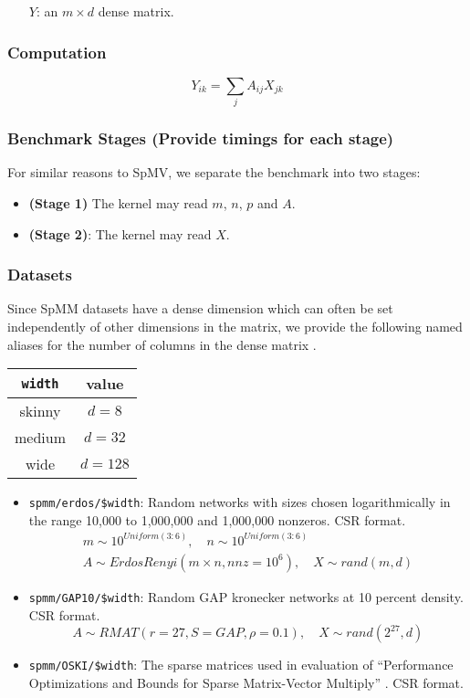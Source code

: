 \documentclass{article}
\begin{document}
\begin{itemize}
	\item[$Y$:] an $m \times d$ dense matrix.
\end{itemize}

\subsubsection{Computation}

$$Y_{ik} = \sum_{j}A_{ij}X_{jk}$$

\subsubsection{Benchmark Stages (Provide timings for each stage)}

For similar reasons to SpMV, we separate the benchmark into two stages:

\begin{itemize}
\item \textbf{(Stage 1)}
	The kernel may read $m$, $n$, $p$ and $A$.
\item \textbf{(Stage 2)}:
	The kernel may read $X$.
\end{itemize}

\subsubsection{Datasets}

	Since SpMM datasets have a dense dimension which can often be set independently
	of other dimensions in the matrix, we provide the following named aliases for the number of columns in the dense matrix \cite{yesil_dense_2022}.

    \begin{tabular}{|c|c|}\hline
        \texttt{width} & value\\
        \hline
        skinny & $d = 8$\\
        medium & $d = 32$\\
        wide & $d = 128$\\\hline
    \end{tabular}

\begin{itemize}
	\item \texttt{spmm/erdos/\$width}: Random networks with sizes chosen logarithmically in the range 10,000 to 1,000,000 and 1,000,000 nonzeros. CSR format.
	\begin{multline*}
		m \sim 10^{Uniform(3:6)}, \quad n \sim 10^{Uniform(3:6)} \\
			A \sim ErdosRenyi\left(m\times n, nnz=10^6\right), \quad X \sim rand(m, d)
	\end{multline*}
	\item \texttt{spmm/GAP10/\$width}: Random GAP kronecker networks at 10 percent
	density. CSR format.
	\[
		A \sim RMAT\left(r=27, S = GAP, \rho = 0.1\right), \quad X \sim rand(2^{27}, d)
	\]
	\item \texttt{spmm/OSKI/\$width}: The sparse matrices used in evaluation of
	``Performance Optimizations and Bounds for Sparse Matrix-Vector Multiply'' \cite{vuduc_performance_2002}. CSR format.
\end{itemize}
\end{document}
